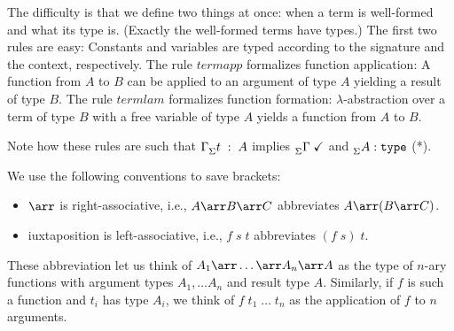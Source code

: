 The difficulty is that we define two things at once: when a term is well-formed and what its type is. (Exactly the well-formed terms have types.) The first two rules are easy: Constants and variables are typed according to the signature and the context, respectively. The rule $termapp$ formalizes function application: A function from $A$ to $B$ can be applied to an argument of type $A$ yielding a result of type $B$. The rule $termlam$ formalizes function formation: $\lambda$-abstraction over a term of type $B$ with a free variable of type $A$ yields a function from $A$ to $B$.

Note how these rules are such that $\Gamma^{}_{\Sigma}t\;:\;A$ implies $^{}_{\Sigma}\Gamma\;\checkmark$ and $^{}_{\Sigma}A:\mathtt{type}$ (*).

\begin{notation}
We use the following conventions to save brackets:
\begin{itemize}
	\item $\arr$ is right-associative, i.e., $A\arr B\arr C$ abbreviates $A\arr (B\arr C)$.
  \item iuxtaposition is left-associative, i.e., $f\;s\;t$ abbreviates $(f\;s)\;t$.
\end{itemize}
These abbreviation let us think of $A_1\arr\ldots\arr A_n\arr A$ as the type of $n$-ary functions with argument types $A_1,\ldots A_n$ and result type $A$. Similarly, if $f$ is such a function and $t_i$ has type $A_i$, we think of $f\;t_1\;\ldots\;t_n$ as the application of $f$ to $n$ arguments.
\end{notation}


%
%
%

